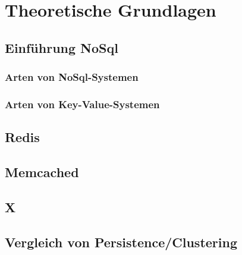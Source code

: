 \chapter{Theoretische Grundlagen}
\section{Einführung NoSql}
\subsection{Arten von NoSql-Systemen}
\subsection{Arten von Key-Value-Systemen}
\section{Redis}
\section{Memcached}
\section{X}
\section{Vergleich von Persistence/Clustering}
